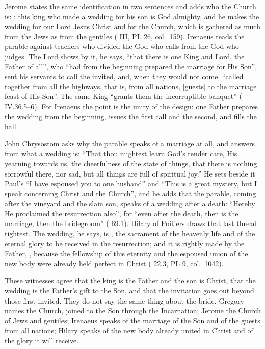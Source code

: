 Jerome states the same identification in two sentences and adds who the Church
is: : this king who made a wedding for his son is
God almighty, and he makes the wedding for our Lord Jesus Christ and for the
Church, which is gathered as much from the Jews as from the gentiles
( III, PL 26, col.~159). Irenaeus reads the
parable against teachers who divided the God who calls from the God who
judges. The Lord shows by it, he says, ``that there is one King and Lord, the
Father of all'', who ``had from the beginning prepared the marriage for His
Son'', sent his servants to call the invited, and, when they would not come,
``called together from all the highways, that is, from all nations, [guests] to
the marriage feast of His Son''. The same King ``grants them the incorruptible
banquet'' ( IV.36.5--6). For Irenaeus the point is the
unity of the design: one Father prepares the wedding from the beginning,
issues the first call and the second, and fills the hall.

John Chrysostom asks why the parable speaks of a marriage at all, and answers
from what a wedding is: ``That thou mightest learn God's tender care, His
yearning towards us, the cheerfulness of the state of things, that there is
nothing sorrowful there, nor sad, but all things are full of spiritual joy.''
He sets beside it Paul's ``I have espoused you to one husband'' and ``This is a
great mystery, but I speak concerning Christ and the Church'', and he adds that
the parable, coming after the vineyard and the slain son, speaks of a wedding
after a death: ``Hereby He proclaimed the resurrection also'', for ``even after
the death, then is the marriage, then the bridegroom'' ( 69.1). Hilary of Poitiers draws that last thread tightest. The
wedding, he says, is , the sacrament of the heavenly life and of the
eternal glory to be received in the resurrection; and it is rightly made by
the Father, , because the fellowship
of this eternity and the espoused union of the new body were already held
perfect in Christ ( 22.3, PL 9, col.~1042).

These witnesses agree that the king is the Father and the son is Christ, that
the wedding is the Father's gift to the Son, and that the invitation goes out
beyond those first invited. They do not say the same thing
about the bride. Gregory names the Church, joined to the Son through the
Incarnation; Jerome the Church of Jews and gentiles; Irenaeus speaks of the
marriage of the Son and of the guests from all nations; Hilary speaks of the
new body already united in Christ and of the glory it will receive.

